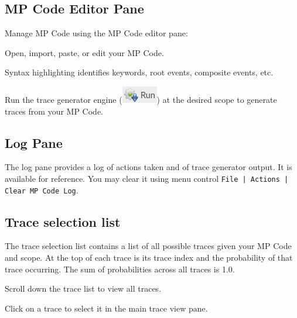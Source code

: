 \documentclass[11pt,fleqn]{article} %
\begin{document}
\subsection{MP Code Editor Pane}
Manage MP Code using the MP Code editor pane:
\begin{compactitem}
\item Open, import, paste, or edit your MP Code.
\item Syntax highlighting identifies keywords, root events, composite events, etc.
\item Run the trace generator engine (\includegraphics[scale=.4]{screenshots/run}) at the desired scope to generate traces from your MP Code.
\end{compactitem}

\subsection{Log Pane}
The log pane provides a log of actions taken and of trace generator output. It is available for reference. You may clear it using menu control \verb+File | Actions | Clear MP Code Log+.

\subsection{Trace selection list}
The trace selection list contains a list of all possible traces given your MP Code and scope.
At the top of each trace is its trace index and the probability of that trace occurring. The sum of probabilities across all traces is 1.0.

\begin{compactitem}
\item Scroll down the trace list to view all traces.
\item Click on a trace to select it in the main trace view pane.
\end{compactitem}
\end{document}
